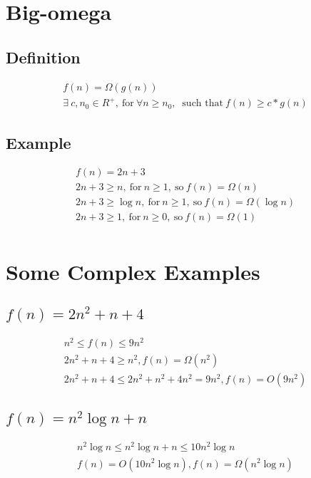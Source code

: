 \documentclass{article}
\begin{document}
\section{Big-omega}
\subsection{Definition}
\begin{gather*}
f(n)=\Omega(g(n)) \\
\exists \ c,n_0\in R^+,\ \text{for} \ \forall n\geq n_0, \ \text{\ such that}\ f(n)\geq c*g(n)
\end{gather*}

\subsection{Example}
\begin{gather*}
    f(n) = 2n + 3 \\
    2n+3 \geq n, \ \text{for} \ n\geq 1,\ \text{so} \ f(n)=\Omega(n) \\
    2n+3 \geq \log n, \ \text{for} \ n\geq 1,\ \text{so} \ f(n)=\Omega(\log n) \\ 
    2n+3 \geq 1, \ \text{for} \ n\geq 0,\ \text{so} \ f(n)=\Omega(1) \\
\end{gather*}
\section{Some Complex Examples}
\subsection{$f(n)=2n^2+n+4$}
\begin{gather*}
n^2 \leq f(n)\leq 9n^2 \\ 
2n^2+n+4 \geq n^2, f(n) = \Omega(n^2) \\
2n^2+n+4 \leq 2n^2+n^2+4n^2 = 9n^2, f(n) = O(9n^2)
\end{gather*}
\subsection{$f(n)=n^2 \log n + n $}
\begin{gather*}
n^2 \log n\leq n^2 \log n + n \leq 10n^2 \log n \\
f(n) = O(10n^2 \log n), f(n) = \Omega(n^2 \log n) \\ 
\end{gather*}
\end{document}

